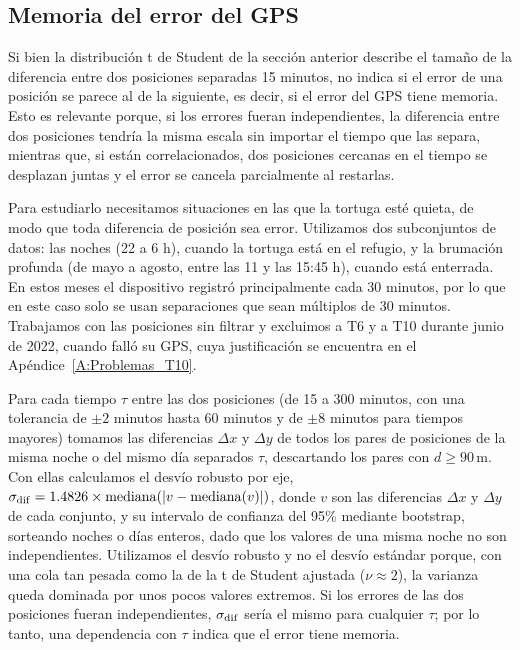 \subsection{Memoria del error del GPS}\label{I:corr_error}

Si bien la distribución t de Student de la sección anterior describe el tamaño de la diferencia entre dos posiciones separadas 15 minutos, 
no indica si el error de una posición se parece al de la siguiente, es decir, si el error del GPS tiene memoria. Esto es relevante porque, 
si los errores fueran independientes, la diferencia entre dos posiciones tendría la misma escala sin importar el tiempo que las separa, 
mientras que, si están correlacionados, dos posiciones cercanas en el tiempo se desplazan juntas y el error se cancela parcialmente al restarlas.

Para estudiarlo necesitamos situaciones en las que la tortuga esté quieta, de modo que toda diferencia de posición sea error. Utilizamos dos subconjuntos de datos: 
las noches (22 a 6 h), cuando la tortuga está en el refugio, y la brumación profunda (de mayo a agosto, entre las 11 y las 15:45 h), cuando está enterrada. 
En estos meses el dispositivo registró principalmente cada 30 minutos, por lo que en este caso solo se usan separaciones que sean múltiplos de 30 minutos. 
Trabajamos con las posiciones sin filtrar y excluimos a T6 y a T10 durante junio de 2022, cuando falló su GPS, cuya justificación se encuentra en el Apéndice~\ref{A:Problemas_T10}.

Para cada tiempo $\tau$ entre las dos posiciones (de 15 a 300 minutos, con una tolerancia de $\pm2$ minutos hasta 60 minutos y de $\pm8$ minutos para tiempos
mayores) tomamos las diferencias $\Delta x$ y $\Delta y$ de todos los pares de posiciones de la misma noche o del mismo día separados $\tau$, descartando los 
pares con $d\geq90\,\mathrm{m}$. Con ellas calculamos el desvío robusto por eje, $\sigma_{\rm dif}=1.4826\times\mathrm{mediana}(|v-\mathrm{mediana}(v)|)$, donde $v$ son las diferencias $\Delta x$ y $\Delta y$ de cada conjunto, 
y su intervalo de confianza del 95\% mediante bootstrap, sorteando noches o días enteros, dado que los valores de una misma noche no son independientes. 
Utilizamos el desvío robusto y no el desvío estándar porque, con una cola tan pesada como la de la t de Student ajustada ($\nu\approx2$), 
la varianza queda dominada por unos pocos valores extremos. Si los errores de las dos posiciones fueran independientes, $\sigma_{\rm dif}$ sería el mismo para cualquier $\tau$; 
por lo tanto, una dependencia con $\tau$ indica que el error tiene memoria.

